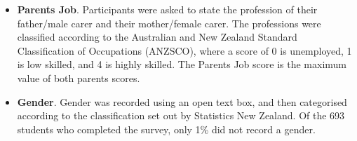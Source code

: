 \begin{itemize}
    \item \textbf{Parents Job}. Participants were asked to state the profession of their father/male carer and their mother/female carer. The professions were classified according to the Australian and New Zealand Standard Classification of Occupations (ANZSCO), where a score of 0 is unemployed, 1 is low skilled, and 4 is highly skilled. The Parents Job score is the maximum value of both parents scores.
    \item \textbf{Gender}. Gender was recorded using an open text box, and then categorised according to the classification set out by Statistics New Zealand. Of the 693 students who completed the survey, only 1\% did not record a gender. 

\end{itemize}
\begin{landscape}
\begin{table}
\label{tab:ItemMeansSDs}       %


\end{table}
\end{landscape}
